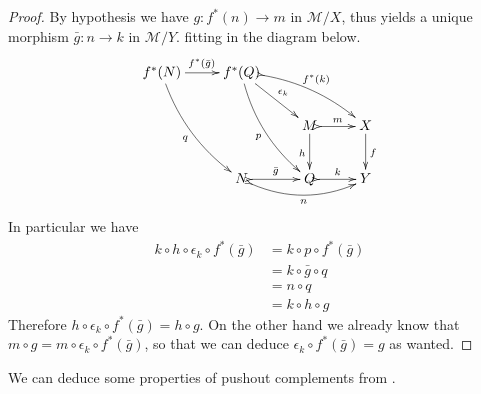 \begin{proof}
By hypothesis we have $g\colon f^*(n)\to m$ in $\mathcal{M}/X$, thus  yields a unique morphism $\bar{g}\colon n\to k$ in $\mathcal{M}/Y$. fitting in the diagram below.
 \[\xymatrix{f^*(N) \ar@/_.3cm/[ddr]_{q} \ar[r]^{f^*(\bar{g})}& f^*(Q) \ar[dr]^{\epsilon_k} \ar@{>->}@/^.3cm/[drr]^{f^*(k)} \ar@/_.3cm/[ddr]_{p}\\&& M \ar@{>->}[r]^{m}\ar[d]_{h}& X \ar[d]^f \\&N \ar@{>->}[r]^{\bar{g}} \ar@{>->}@/_.4cm/[rr]_{n} &Q\ar@{>->}[r]^{k}&Y}\]
In particular we have
\begin{align*}k\circ h\circ \epsilon_k\circ f^*(\bar{g})&=k\circ p\circ f^*(\bar{g})\\&=k\circ \bar{g}\circ q\\&=n\circ q\\&=k\circ h\circ g
\end{align*}
Therefore $ h\circ \epsilon_k\circ f^*(\bar{g})=h\circ g$. On the other hand we already know that $m\circ g=m\circ \epsilon_k\circ f^*(\bar{g})$, so that we can deduce $\epsilon_k \circ f^*(\bar{g})=g$ as wanted.
\end{proof}

We can deduce some properties of pushout complements from .

